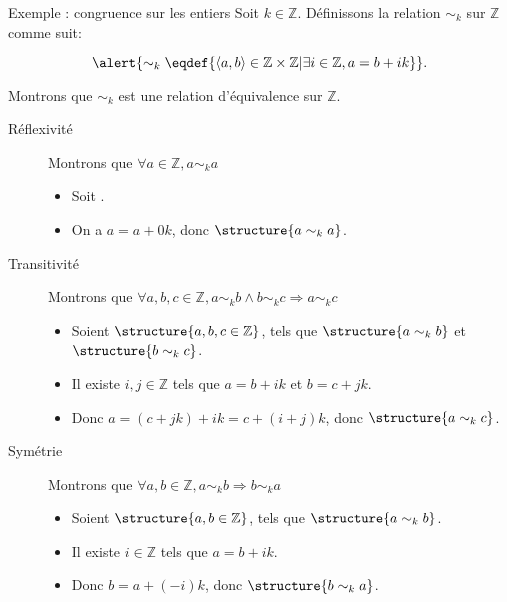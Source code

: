 
\begingroup

\begin{frame}{Exemple : congruence sur les entiers}
  \small
  Soit $k\in \mathbb{Z}$. Définissons la relation $\sim_k$ sur $\mathbb{Z}$ comme suit:

  $$\alert{\sim_k \eqdef \{\langle a, b\rangle \in \mathbb{Z}\times \mathbb{Z} | \exists i\in \mathbb{Z}, a = b + i k \}}.$$

  
  Montrons que $\sim_k$ est une relation d'équivalence sur $\mathbb{Z}$.
  \begin{description}
  \item[Réflexivité]  Montrons que \alert{$\forall a \in \mathbb{Z}, a \sim_k a$}
    \begin{itemize}
    \item Soit .
    \item On a $a=a + 0k$, donc $\structure{a\sim_k a}$.
    \end{itemize}
  \item[Transitivité] Montrons que \alert{$\forall a, b, c \in \mathbb{Z}, a \sim_k b \land b \sim_k c \Rightarrow a \sim_k c$}
    \begin{itemize}
    \item Soient $\structure{a, b, c \in \mathbb{Z}}$, tels que $\structure{a \sim_k b}$ et $\structure{b \sim_k c}$. 
    \item Il existe $i, j \in \mathbb{Z}$ tels que $a = b + i k$ et $b = c + j k$.
    \item Donc $a = (c + j k) + i k = c + (i+j) k$, donc $\structure{a \sim_k c}$.
    \end{itemize}
  \item[Symétrie] Montrons que \alert{$\forall a, b \in \mathbb{Z}, a \sim_k b \Rightarrow b \sim_k a$}
    \begin{itemize}
    \item Soient $\structure{a, b \in \mathbb{Z}}$, tels que $\structure{a \sim_k b}$. 
    \item Il existe $i \in \mathbb{Z}$ tels que $a = b + i k$.
    \item Donc $b = a + (-i) k$, donc $\structure{b \sim_k a}$.
    \end{itemize}
  \end{description}
\end{frame}

\endgroup
